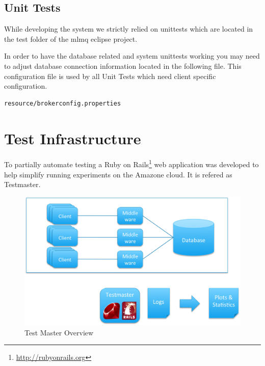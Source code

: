 \documentclass[a4paper]{article}
\begin{document}
\subsection{Unit Tests}
While developing the system we strictly relied on unittests which are located in the test folder of the mlmq eclipse project.

In order to have the database related and system unittests working you may need to adjust database connection information located in the following file. This configuration file is used by all Unit Tests which need client specific configuration.

\begin{verbatim}
resource/brokerconfig.properties
\end{verbatim}

\pagebreak

\section{Test Infrastructure}
\label{sec:TestInfrastructure}

To partially automate testing a Ruby on Rails\footnote{\url{http://rubyonrails.org}} web application was developed to help simplify running experiments on the Amazone cloud. It is refered as Testmaster.


\begin{figure}[H]
	\begin{center}
    \includegraphics[scale=0.4]{../drawings/testsystem-overview.png}
  \end{center}
  \caption{Test Master Overview}
  \label{fig:testmaster}
\end{figure}
\end{document}
